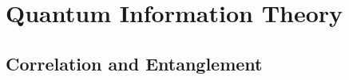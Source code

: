 \documentclass[12pt]{report}
\title{\sc{Title's name}}
\author{Author's name}
\date{\today}
\numberwithin{theorem}{section}
\numberwithin{corollary}{section}
\numberwithin{proposition}{section}
\numberwithin{definition}{section}
\begin{document}
\maketitle\newpage
{}
\dominitoc
\tableofcontents
\clearpage
\setcounter{page}{1}
\part{Quantum Information Theory}
\chapter{Correlation and Entanglement}
\minitoc
\end{document}
